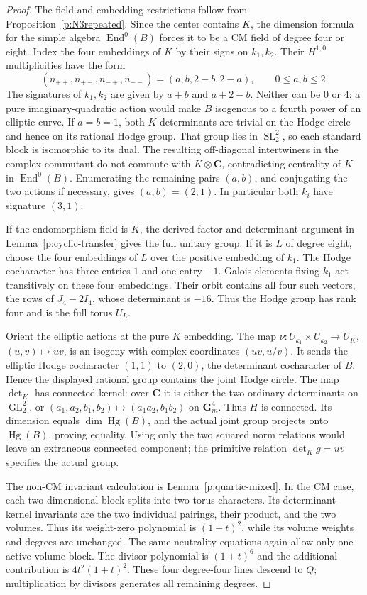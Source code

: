 \documentclass[11pt,reqno]{article}
\theoremstyle{emphasizedplain}
\theoremstyle{emphasizeddefinition}
\theoremstyle{emphasizeddefinition}
\DeclareMathOperator{\End}{End}
\DeclareMathOperator{\Hg}{Hg}
\DeclareMathOperator{\GL}{GL}
\DeclareMathOperator{\SL}{SL}
\newcommand{\C}{\mathbf C}
\begin{document}
\begin{proof}
The field and embedding restrictions follow from
Proposition~\ref{p:N3repeated}. Since the center contains $K$,
the dimension formula for the simple algebra $\End^0(B)$ forces
it to be a CM field of degree four or eight.
Index the four embeddings of $K$ by their signs on $k_1,k_2$.
Their $H^{1,0}$ multiplicities have the form
\[
 (n_{++},n_{+-},n_{-+},n_{--})=(a,b,2-b,2-a),
 \qquad 0\leq a,b\leq2.
\]
The signatures of $k_1,k_2$ are given by $a+b$ and $a+2-b$.
Neither can be $0$ or $4$: a pure imaginary-quadratic action
would make $B$ isogenous to a fourth power of an elliptic curve.
If $a=b=1$, both $K$ determinants are trivial on the Hodge circle
and hence on its rational Hodge group. That group lies in
$\SL_2^2$, so each standard block is isomorphic to its dual.
The resulting off-diagonal intertwiners in the complex commutant
do not commute with $K\otimes\C$, contradicting centrality of
$K$ in $\End^0(B)$. Enumerating the remaining pairs $(a,b)$,
and conjugating the two actions if necessary, gives
$(a,b)=(2,1)$. In particular both $k_i$ have signature $(3,1)$.

If the endomorphism field is $K$, the derived-factor and determinant
argument in Lemma~\ref{p:cyclic-transfer} gives the full unitary
group. If it is $L$ of degree eight, choose the four embeddings
of $L$ over the positive embedding of $k_1$. The Hodge cocharacter
has three entries $1$ and one entry $-1$. Galois elements fixing
$k_1$ act transitively on these four embeddings. Their orbit
contains all four such vectors, the rows of $J_4-2I_4$, whose
determinant is $-16$. Thus the Hodge group has rank four and is
the full torus $U_L$.

Orient the elliptic actions at the pure $K$ embedding. The map
$\nu:U_{k_1}\times U_{k_2}\to U_K$, $(u,v)\mapsto uv$,
is an isogeny with complex coordinates $(uv,u/v)$. It sends the
elliptic Hodge cocharacter $(1,1)$ to $(2,0)$, the determinant
cocharacter of $B$. Hence the displayed rational group contains
the joint Hodge circle. The map $\det_K$ has connected kernel:
over $\C$ it is either the two ordinary determinants on
$\GL_2^2$, or $(a_1,a_2,b_1,b_2)\mapsto(a_1a_2,b_1b_2)$
on $\mathbf G_m^4$. Thus $H$ is connected. Its dimension equals
$\dim\Hg(B)$, and the actual joint group projects onto
$\Hg(B)$, proving equality. Using only the two squared norm
relations would leave an extraneous connected component; the
primitive relation $\det_K g=uv$ specifies the actual group.

The non-CM invariant calculation is Lemma~\ref{p:quartic-mixed}.
In the CM case, each two-dimensional block splits into two torus
characters. Its determinant-kernel invariants are the two
individual pairings, their product, and the two volumes. Thus its
weight-zero polynomial is $(1+t)^2$, while its volume weights
and degrees are unchanged. The same neutrality equations again
allow only one active volume block. The divisor polynomial is
$(1+t)^6$ and the additional contribution is
$4t^2(1+t)^2$. These four degree-four lines descend to $Q$;
multiplication by divisors generates all remaining degrees.
\end{proof}
\end{document}
